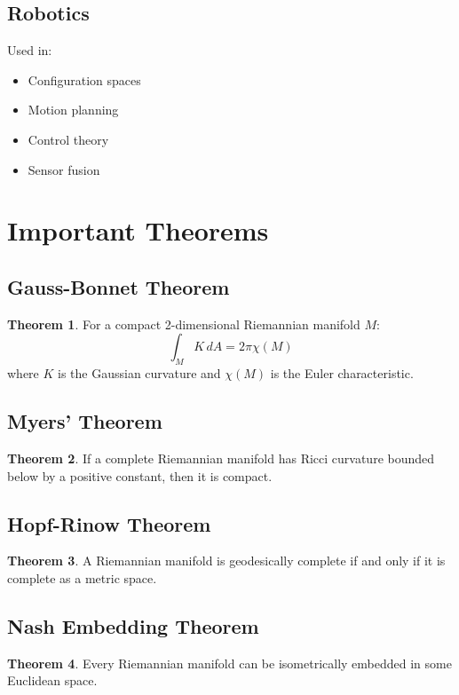 \documentclass[11pt]{article}
\theoremstyle{definition}
\newtheorem{theorem}{Theorem}[section]
\begin{document}
\subsection{Robotics}
Used in:
\begin{itemize}
    \item Configuration spaces
    \item Motion planning
    \item Control theory
    \item Sensor fusion
\end{itemize}

\section{Important Theorems}

\subsection{Gauss-Bonnet Theorem}
\begin{theorem}
For a compact 2-dimensional Riemannian manifold $M$:
$$\int_M K \, dA = 2\pi \chi(M)$$
where $K$ is the Gaussian curvature and $\chi(M)$ is the Euler characteristic.
\end{theorem}

\subsection{Myers' Theorem}
\begin{theorem}
If a complete Riemannian manifold has Ricci curvature bounded below by a positive constant, then it is compact.
\end{theorem}

\subsection{Hopf-Rinow Theorem}
\begin{theorem}
A Riemannian manifold is geodesically complete if and only if it is complete as a metric space.
\end{theorem}

\subsection{Nash Embedding Theorem}
\begin{theorem}
Every Riemannian manifold can be isometrically embedded in some Euclidean space.
\end{theorem}
\end{document}
